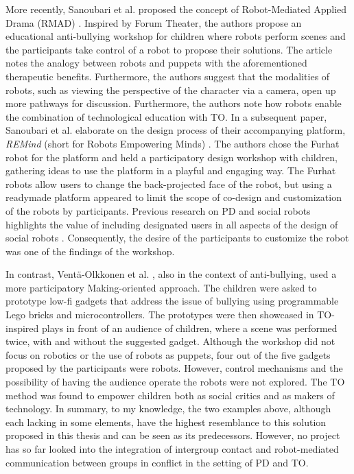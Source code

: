\documentclass[dissertation,math,vertlayout,pdfa,colorlinks,nologo]{aaltoseries}
\begin{document}
More recently, Sanoubari et al. proposed the concept of Robot-Mediated Applied Drama (RMAD) \cite{sanoubariUsingRobotMediatedApplied2023}. Inspired by Forum Theater, the authors propose an educational anti-bullying workshop for children where robots perform scenes and the participants take control of a robot to propose their solutions. The article notes the analogy between robots and puppets with the aforementioned therapeutic benefits. Furthermore, the authors suggest that the modalities of robots, such as viewing the perspective of the character via a camera, open up more pathways for discussion. Furthermore, the authors note how robots enable the combination of technological education with TO. In a subsequent paper, Sanoubari et al. elaborate on the design process of their accompanying platform, \textit{REMind} (short for Robots Empowering Minds) \cite{sanoubariWhatMakesEducational2024}. The authors chose the Furhat robot\cite{almoubayedFurhatBackProjectedHumanLike2012} for the platform and held a participatory design workshop with children, gathering ideas to use the platform in a playful and engaging way. The Furhat robots allow users to change the back-projected face of the robot, but using a readymade platform appeared to limit the scope of co-design and customization of the robots by participants. Previous research on PD and social robots highlights the value of including designated users in all aspects of the design of social robots \cite{axelssonSocialRobotCoDesign2021}. Consequently, the desire of the participants to customize the robot was one of the findings of the workshop.

In contrast, Ventä-Olkkonen et al. \cite{venta-olkkonenAllWorldOur2022}, also in the context of anti-bullying, used a more participatory Making-oriented approach. The children were asked to prototype low-fi gadgets that address the issue of bullying using programmable Lego bricks and microcontrollers. The prototypes were then showcased in TO-inspired plays in front of an audience of children, where a scene was performed twice, with and without the suggested gadget. Although the workshop did not focus on robotics or the use of robots as puppets, four out of the five gadgets proposed by the participants were robots. However, control mechanisms and the possibility of having the audience operate the robots were not explored. The TO method was found to empower children both as social critics and as makers of technology. In summary, to my knowledge, the two examples above, although each lacking in some elements, have the highest resemblance to this solution proposed in this thesis and can be seen as its predecessors. However, no project has so far looked into the integration of intergroup contact and robot-mediated communication between groups in conflict in the setting of PD and TO.
\end{document}

